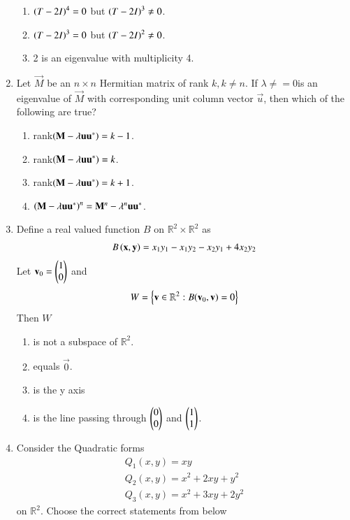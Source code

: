\begin{enumerate}[label=\thesection.\arabic*.,ref=\thesection.\theenumi]
\begin{enumerate}
\item $\left(T-2I\right)^4 = 0$ but $\left(T-2I\right)^3 \ne 0$.
\item $\left(T-2I\right)^3 = 0$ but $\left(T-2I\right)^2 \ne 0$.
\item 2 is an eigenvalue with multiplicity 4.
\end{enumerate}
%
\item Let $\vec{M}$ be an $n \times n$ Hermitian matrix of rank $k, k \ne n$.  If $\lambda \ne = 0$is an eigenvalue of $\vec{M}$ with corresponding unit column vector $\vec{u}$, then which of the
following are true?
\begin{enumerate}
\item rank$\left(\mathbf{M}- \lambda \mathbf{u}\mathbf{u}^*\right) = k-1$.
\item rank$\left(\mathbf{M}- \lambda \mathbf{u}\mathbf{u}^*\right) = k$.
\item rank$\left(\mathbf{M}- \lambda \mathbf{u}\mathbf{u}^*\right) = k+1$.
\item $\left(\mathbf{M}- \lambda \mathbf{u}\mathbf{u}^*\right)^n = \mathbf{M}^n - \lambda^n \mathbf{u}\mathbf{u}^*$.
\end{enumerate}
%
\item Define a real valued function $B$ on $\mathbb{R}^2 \times \mathbb{R}^2 $ as 
\begin{align}
B\left(\mathbf{x},\mathbf{y}\right) = x_1y_1 - x_1y_2-x_2y_1+4x_2y_2
\end{align}
Let $\mathbf{v}_0 = \begin{pmatrix}1\\0\end{pmatrix}$ and 
\begin{align}
W = \left\{\mathbf{v} \in \mathbb{R}^2: B(\mathbf{v}_0,\mathbf{v}) =0\right\}
\end{align}
Then $W$
\begin{enumerate}
\item is not a subspace of $\mathbb{R}^2$.
\item equals $\vec{0}$.
\item is the y axis
\item is the line passing through $\begin{pmatrix}0 \\ 0\end{pmatrix}$ and $\begin{pmatrix}1 \\ 1\end{pmatrix}$.
\end{enumerate}
%
\item Consider the Quadratic forms
\begin{align}
Q_1(x,y) = xy
\\
Q_2(x,y) = x^2+2xy+y^2
\\
Q_3(x,y) = x^2+3xy+2y^2
\end{align}
%
on $\mathbb{R}^2$.  Choose the correct statements from below
\begin{enumerate}

\end{enumerate}
\end{enumerate}
